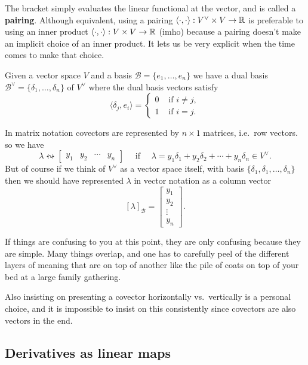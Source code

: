 \documentclass[12pt]{amsart}
\begin{document}
The bracket simply evaluates  the linear functional at the vector, and is called a {\bf pairing}. Although equivalent, using a pairing $\langle \cdot, \cdot \rangle : V^\vee \times V \to \mathbb{R}$ is preferable to using an inner product $\langle\cdot, \cdot \rangle : V \times V \to \mathbb{R}$ (imho) because a pairing doesn't make an implicit choice of an inner product. It lets us be very explicit when the time comes to make that choice. 

Given a vector space $V$ and a basis $\mathcal{B} = \{e_1, \ldots, e_n\}$ we have a dual basis $\mathcal{B}^\vee = \{\delta_1, \ldots, \delta_n\}$ of $V^\vee$ where the dual basis vectors satisfy
\[
	\langle \delta_j, e_i \rangle = \begin{cases} 0 & \text{ if } i \neq j, \\
	1 &\text{ if }  i = j. \end{cases}
\]

In matrix notation covectors are represented by $n\times 1$ matrices, i.e.\ row vectors. so we have
\[
	\lambda  \leftrightsquigarrow \begin{bmatrix} y_1 & y_2 & \cdots & y_n \end{bmatrix} \quad \text{ if } \quad \lambda = y_1 \delta_1 + y_2 \delta_2 + \cdots + y_n \delta_n \in V^\vee.
\] 
But of course if we think of $V^\vee$ as a vector space itself, with basis $\{\delta_1, \delta_1, \ldots, \delta_n\}$ then we should have represented $\lambda$ in vector notation as a column vector
\[
	[\lambda]_{\mathcal{B}} = \begin{bmatrix} y_1 \\ y_2 \\ \vdots \\ y_n \end{bmatrix}.
\]

If things are confusing to you at this point, they are only confusing because they are simple. Many things overlap, and one has to carefully peel of the different layers of meaning that are on top of another like the pile of coats on top of your bed at a large family gathering.

Also insisting on presenting a covector horizontally vs.\ vertically is a personal choice, and it is impossible to insist on this consistently since covectors are also vectors in the end. 

\subsection*{Derivatives as linear maps}
\end{document}
